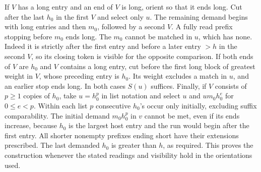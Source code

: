 \documentclass[11pt,a4paper]{article}
\begin{document}
If $V$ has a long entry and an end of $V$ is long, orient so that it ends long. Cut after the last $h_0$ in the first $V$ and select only $u$. The remaining demand begins with long entries and then $m_0$, followed by a second $V$. A fully read prefix stopping before $m_0$ ends long. The $m_0$ cannot be matched in $u$, which has none. Indeed it is strictly after the first entry and before a later entry $>h$ in the second $V$, so its closing token is visible for the opposite comparison. If both ends of $V$ are $h_0$ and $V$ contains a long entry, cut before the first long block of greatest weight in $V$, whose preceding entry is $h_0$. Its weight excludes a match in $u$, and an earlier stop ends long. In both cases $S(u)$ suffices. Finally, if $V$ consists of $p\ge1$ copies of $h_0$, take $u=h_0^p$ in list notation and select $u$ and $u m_0 h_0^e$ for $0\le e<p$. Within each list $p$ consecutive $h_0$'s occur only initially, excluding suffix comparability. The initial demand $m_0 h_0^p$ in $v$ cannot be met, even if its ends increase, because $h_0$ is the largest host entry and the run would begin after the first entry. All shorter nonempty prefixes ending short have their extensions prescribed. The last demanded $h_0$ is greater than $h$, as required. This proves the construction whenever the stated readings and visibility hold in the orientations used.
\end{document}
